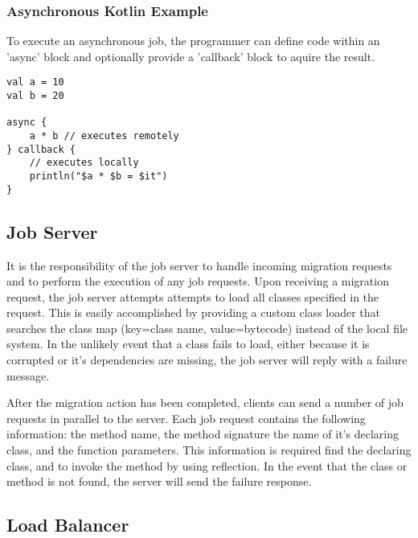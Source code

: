 \subsubsection{Asynchronous Kotlin Example}

To execute an asynchronous job, the programmer can define code within an
'async' block and optionally provide a 'callback' block to aquire the result.

\begin{lstlisting}
val a = 10
val b = 20

async {
    a * b // executes remotely
} callback {
    // executes locally
    println("$a * $b = $it")
}
\end{lstlisting}

\subsection{Job Server}\label{subsec:jobServer}

It is the responsibility of the job server to handle incoming
migration requests and to perform the execution of any job requests.
Upon receiving a migration request, the job server attempts attempts to
load all classes specified in the request.
This is easily accomplished by providing a custom class loader
that searches the class map (key=class name, value=bytecode) instead
of the local file system.
In the unlikely event that a class fails to load, either because it is corrupted or
it's dependencies are missing, the job server will reply with a failure message.

After the migration action has been completed, clients can send a number of job requests
in parallel to the server.
Each job request contains the following information: the method name, the method signature
the name of it's declaring class, and the function parameters.
This information is required find the declaring class, and to invoke the method
by using reflection.
In the event that the class or method is not found, the server will send the failure
response.


\subsection{Load Balancer}\label{subsec:modules}

